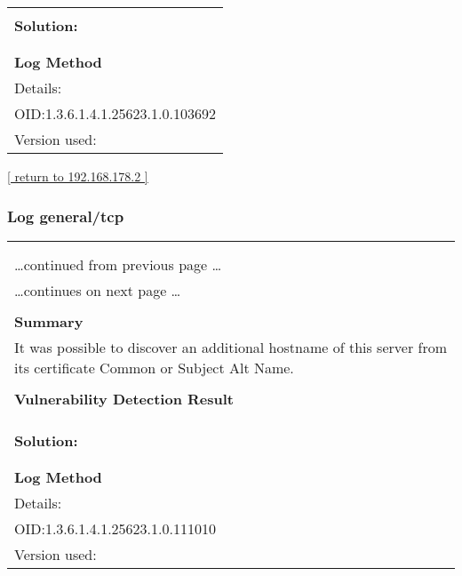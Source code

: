 \documentclass{article}
\begin{document}
\begin{longtable}{|p{}|}
          \hline
          \\
\textbf{Solution:}\\
\\


        \hline
        \\
\textbf{Log Method}\\
Details:
\rowcolor{white}{\verb=SSL/TLS: Collect and Report Certificate Details=}\\
OID:1.3.6.1.4.1.25623.1.0.103692\\
Version used:
\rowcolor{white}{\verb=2021-12-10T12:48:00Z=}\\
\end{longtable}

\begin{footnotesize}\hyperref[host:192.168.178.2]{[ return to 192.168.178.2 ]}\end{footnotesize}
\subsubsection{Log general/tcp}
\label{port:192.168.178.2 general/tcp Log}

\begin{longtable}{|p{}|}
\hline
\rowcolor{gvm_log}{\color{white}{Log (CVSS: 0.0) }}\\
\rowcolor{gvm_log}{\color{white}{NVT: SSL/TLS: Hostname discovery from server certificate}}\\
\hline
\endfirsthead
\hfill\ldots continued from previous page \ldots \\
\hline
\endhead
\hline
\ldots continues on next page \ldots \\
\endfoot
\hline
\endlastfoot
\\
\textbf{Summary}\\
It was possible to discover an additional hostname
  of this server from its certificate Common or Subject Alt Name.\\

        \hline
        \\
\textbf{Vulnerability Detection Result}\\
\rowcolor{white}{\verb=The following additional but not resolvable hostnames were detected:=}\\
\rowcolor{white}{\verb=48f7b451fe6e=}\\

          \hline
          \\
\textbf{Solution:}\\
\\


        \hline
        \\
\textbf{Log Method}\\
Details:
\rowcolor{white}{\verb=SSL/TLS: Hostname discovery from server certificate=}\\
OID:1.3.6.1.4.1.25623.1.0.111010\\
Version used:
\rowcolor{white}{\verb=2021-11-22T15:32:39Z=}\\
\end{longtable}
\end{document}
